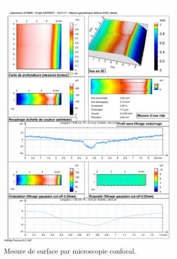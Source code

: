\begin{figure}[tbhp]
\begin{subfigure}[c]{0.48\textwidth}
		\includegraphics[width=\textwidth]{../Chap2/Figures/altisurf_defect.pdf}
		\caption{Mesure de surface par microscopie confocal.}
	\end{subfigure} \\
	\vspace{3\baselineskip}
	\begin{subfigure}[c]{\textwidth}
		\centering

\end{subfigure}
\end{figure}
